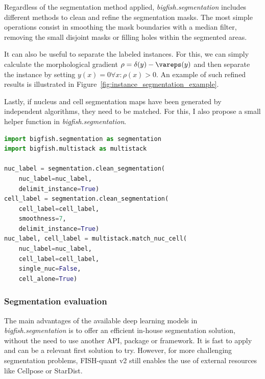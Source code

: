 Regardless of the segmentation method applied, \emph{bigfish.segmentation} includes different methods to clean and refine the segmentation masks.
The most simple operations consist in smoothing the mask boundaries with a median filter, removing the small disjoint masks or filling holes within the segmented areas.

It can also be useful to separate the labeled instances. For this, we can simply calculate the morphological gradient $\rho = \delta(y) - \vareps(y)$ and then separate the instance by setting $y(x) = 0 \forall x: \rho(x) > 0$. 
An example of such refined results is illustrated in Figure~\ref{fig:instance_segmentation_example}.

Lastly, if nucleus and cell segmentation maps have been generated by independent algorithms, they need to be matched. For this, I also propose a small helper function in \emph{bigfish.segmentation}. 


\begin{minipage}{0.9\textwidth}
\begin{lstlisting}[language=Python]
import bigfish.segmentation as segmentation
import bigfish.multistack as multistack

nuc_label = segmentation.clean_segmentation(
	nuc_label=nuc_label,
	delimit_instance=True)
cell_label = segmentation.clean_segmentation(
	cell_label=cell_label,
	smoothness=7,
	delimit_instance=True)
nuc_label, cell_label = multistack.match_nuc_cell(
	nuc_label=nuc_label,
	cell_label=cell_label,
	single_nuc=False,
	cell_alone=True)
\end{lstlisting}
\end{minipage}

\subsubsection{Segmentation evaluation}

The main advantages of the available deep learning models in \emph{bigfish.segmentation} is to offer an efficient in-house segmentation solution, without the need to use another API, package or framework.
It is fast to apply and can be a relevant first solution to try.
However, for more challenging segmentation problems, FISH-quant v2 still enables the use of external resources like Cellpose or StarDist.

